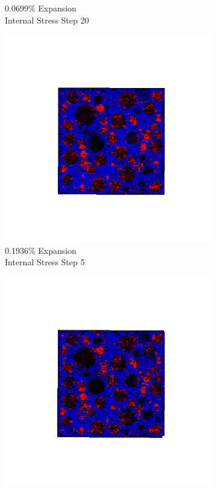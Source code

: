 \begin{figure}[ht!]
\begin{subfigure}{.25\textwidth}
      \caption{0.0699\% Expansion\\Internal Stress Step 20}
    \end{subfigure}

    \begin{subfigure}{.25\textwidth}
      \centering
      \includegraphics[width=1.0\linewidth]{Files/exp_3D/ASR/A30P75_2_s5.png}
      \caption{0.1936\% Expansion\\Internal Stress Step 5}
    \end{subfigure}%
    \begin{subfigure}{.25\textwidth}
      \centering
      \includegraphics[width=1.0\linewidth]{Files/exp_3D/ASR/A30P75_2_s10.png}

\end{subfigure}
\end{figure}
